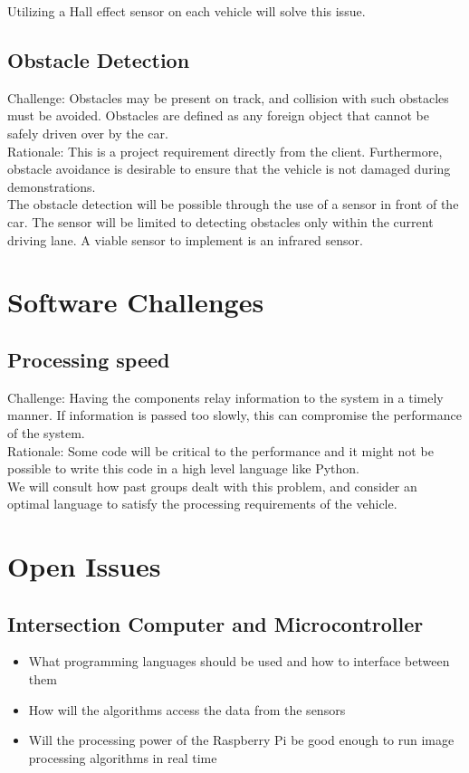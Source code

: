 \documentclass [11pt]{article}
\begin{document}
Utilizing a Hall effect sensor on each vehicle will solve this issue. 


\subsection{Obstacle Detection}

Challenge: Obstacles may be present on track, and collision with such obstacles must be avoided. Obstacles are defined as any foreign object that cannot be safely driven over by the car. \\

Rationale: This is a project requirement directly from the client. Furthermore, obstacle avoidance is desirable to ensure that the vehicle is not damaged during demonstrations. \\

The obstacle detection will be possible through the use of a sensor in front of the car. The sensor will be limited to detecting obstacles only within the current driving lane. A viable sensor to implement is an infrared sensor.  



\section {Software Challenges}
\subsection{Processing speed}
Challenge: Having the components relay information to the system in a timely manner. If information is passed too slowly, this can compromise the performance of the system. \\

Rationale: Some code will be critical to the performance and it might not be possible to write this code in a high level language like Python. \\

We will consult how past groups dealt with this problem, and consider an optimal language to satisfy the processing requirements of the vehicle. 
 

\section{Open Issues}


\subsection{Intersection Computer and Microcontroller}

\begin{itemize}
    \item  What programming languages should be used and how to interface between them
    \item How will the algorithms access the data from the sensors
    \item Will the processing power of the Raspberry Pi be good enough to run image processing algorithms in real time
\end{itemize}
\end{document}
